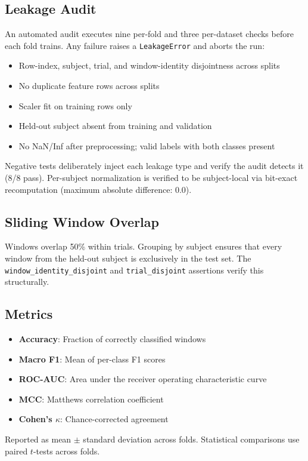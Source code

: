 \documentclass[conference]{IEEEtran}
\begin{document}
\subsection{Leakage Audit}
An automated audit executes nine per-fold and three per-dataset checks before each fold trains. Any failure raises a \texttt{LeakageError} and aborts the run:
\begin{itemize}
    \item Row-index, subject, trial, and window-identity disjointness across splits
    \item No duplicate feature rows across splits
    \item Scaler fit on training rows only
    \item Held-out subject absent from training and validation
    \item No NaN/Inf after preprocessing; valid labels with both classes present
\end{itemize}

Negative tests deliberately inject each leakage type and verify the audit detects it (8/8 pass). Per-subject normalization is verified to be subject-local via bit-exact recomputation (maximum absolute difference: 0.0).

\subsection{Sliding Window Overlap}
Windows overlap 50\% within trials. Grouping by subject ensures that every window from the held-out subject is exclusively in the test set. The \texttt{window\_identity\_disjoint} and \texttt{trial\_disjoint} assertions verify this structurally.

\subsection{Metrics}
\begin{itemize}
    \item \textbf{Accuracy}: Fraction of correctly classified windows
    \item \textbf{Macro F1}: Mean of per-class F1 scores
    \item \textbf{ROC-AUC}: Area under the receiver operating characteristic curve
    \item \textbf{MCC}: Matthews correlation coefficient
    \item \textbf{Cohen's $\kappa$}: Chance-corrected agreement
\end{itemize}
Reported as mean $\pm$ standard deviation across folds. Statistical comparisons use paired $t$-tests across folds.
\end{document}
